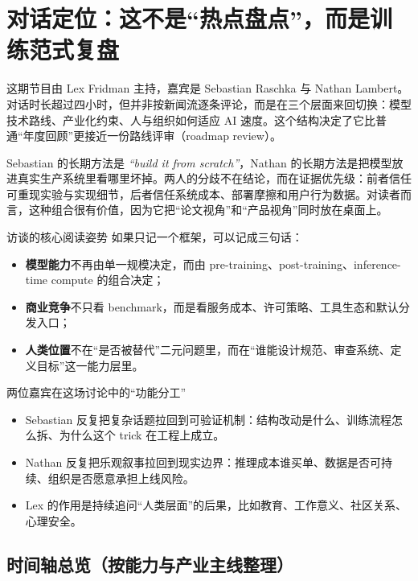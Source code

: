 \section{对话定位：这不是“热点盘点”，而是训练范式复盘}

这期节目由 Lex Fridman 主持，嘉宾是 Sebastian Raschka 与 Nathan Lambert。对话时长超过四小时，但并非按新闻流逐条评论，而是在三个层面来回切换：模型技术路线、产业化约束、人与组织如何适应 AI 速度。这个结构决定了它比普通“年度回顾”更接近一份路线评审（roadmap review）。

Sebastian 的长期方法是 \textit{``build it from scratch''}，Nathan 的长期方法是把模型放进真实生产系统里看哪里坏掉。两人的分歧不在结论，而在证据优先级：前者信任可重现实验与实现细节，后者信任系统成本、部署摩擦和用户行为数据。对读者而言，这种组合很有价值，因为它把“论文视角”和“产品视角”同时放在桌面上。

\begin{importantbox}{访谈的核心阅读姿势}
如果只记一个框架，可以记成三句话：
\begin{itemize}[leftmargin=1.5em]
    \item \textbf{模型能力}不再由单一规模决定，而由 pre-training、post-training、inference-time compute 的组合决定；
    \item \textbf{商业竞争}不只看 benchmark，而是看服务成本、许可策略、工具生态和默认分发入口；
    \item \textbf{人类位置}不在“是否被替代”二元问题里，而在“谁能设计规范、审查系统、定义目标”这一能力层里。
\end{itemize}
\end{importantbox}

\begin{knowledgebox}{两位嘉宾在这场讨论中的“功能分工”}
\begin{itemize}[leftmargin=1.5em]
    \item Sebastian 反复把复杂话题拉回到可验证机制：结构改动是什么、训练流程怎么拆、为什么这个 trick 在工程上成立。
    \item Nathan 反复把乐观叙事拉回到现实边界：推理成本谁买单、数据是否可持续、组织是否愿意承担上线风险。
    \item Lex 的作用是持续追问“人类层面”的后果，比如教育、工作意义、社区关系、心理安全。
\end{itemize}
\end{knowledgebox}

\subsection{时间轴总览（按能力与产业主线整理）}

